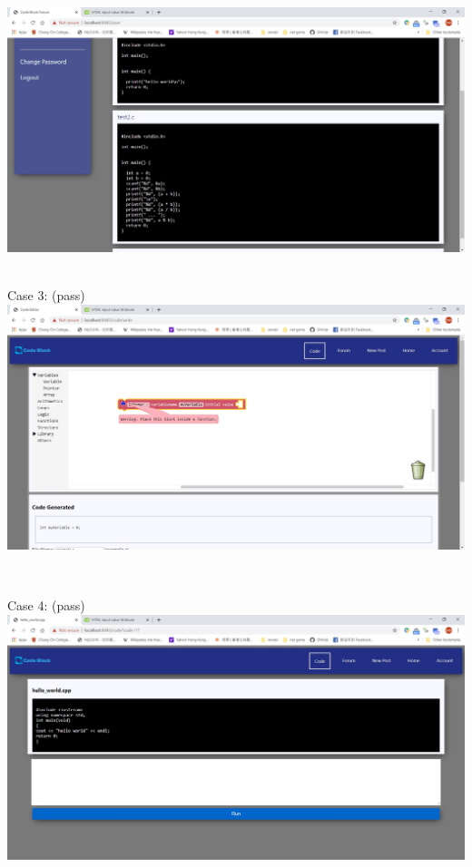 \includegraphics[scale=0.45]{Doc/Pics/case-6-1-2-5}\\

~

Case 3: (pass)\\
\includegraphics[scale=0.45]{Doc/Pics/case-6-1-3}

~

Case 4: (pass)\\
\includegraphics[scale=0.45]{Doc/Pics/case-6-1-4}

~

